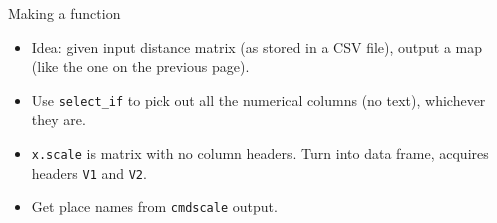 \documentclass[ignorenonframetext,]{beamer}
\newenvironment{Shaded}{\begin{snugshade}}{\end{snugshade}}
\newcommand{\CommentTok}[1]{\textcolor[rgb]{0.56,0.35,0.01}{\textit{#1}}}
\newcommand{\ControlFlowTok}[1]{\textcolor[rgb]{0.13,0.29,0.53}{\textbf{#1}}}
\newcommand{\DataTypeTok}[1]{\textcolor[rgb]{0.13,0.29,0.53}{#1}}
\newcommand{\KeywordTok}[1]{\textcolor[rgb]{0.13,0.29,0.53}{\textbf{#1}}}
\newcommand{\NormalTok}[1]{#1}
\newcommand{\OperatorTok}[1]{\textcolor[rgb]{0.81,0.36,0.00}{\textbf{#1}}}
\newcommand{\StringTok}[1]{\textcolor[rgb]{0.31,0.60,0.02}{#1}}
\providecommand{\tightlist}{%
  \setlength{\itemsep}{0pt}\setlength{\parskip}{0pt}}
\begin{document}
\begin{frame}[fragile]{Making a function}
\protect\hypertarget{making-a-function}{}

\begin{itemize}
\tightlist
\item
  Idea: given input distance matrix (as stored in a CSV file), output a
  map (like the one on the previous page).
\end{itemize}

\begin{Shaded}
\end{Shaded}

\begin{itemize}
\item
  Use \texttt{select\_if} to pick out all the numerical columns (no
  text), whichever they are.
\item
  \texttt{x.scale} is matrix with no column headers. Turn into data
  frame, acquires headers \texttt{V1} and \texttt{V2}.
\item
  Get place names from \texttt{cmdscale} output.
\end{itemize}

\end{frame}
\end{document}
